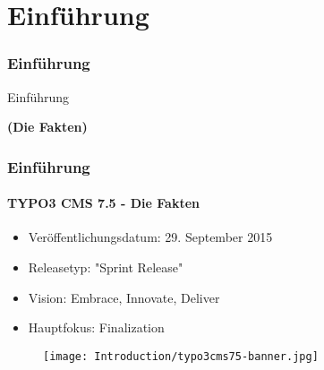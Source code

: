 %

\section{Einführung}
\begin{frame}[fragile]
	\frametitle{Einführung}

	\begin{center}\huge{Einführung}\end{center}
	\begin{center}\huge{\color{typo3darkgrey}\textbf{(Die Fakten)}}\end{center}

\end{frame}

\begin{frame}[fragile]
	\frametitle{Einführung}
	\framesubtitle{TYPO3 CMS 7.5 - Die Fakten}

	\begin{itemize}
		\item Veröffentlichungsdatum: 29. September 2015
		\item Releasetyp: "Sprint Release"
		\item Vision: Embrace, Innovate, Deliver
		\item Hauptfokus: Finalization
	\end{itemize}

	\begin{figure}
		\texttt{[image: Introduction/typo3cms75-banner.jpg]}
	\end{figure}

\end{frame}


